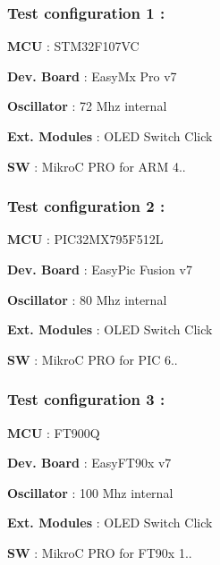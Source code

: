 \subsubsection*{Test configuration 1 \+: }

\begin{DoxyParagraph}{}

\begin{DoxyItemize}
\item {\bfseries M\+C\+U} \+: S\+T\+M32\+F107\+V\+C 
\item {\bfseries Dev. Board} \+: Easy\+Mx Pro v7 
\item {\bfseries Oscillator} \+: 72 Mhz internal 
\item {\bfseries Ext. Modules} \+: O\+L\+E\+D Switch Click 
\item {\bfseries S\+W} \+: Mikro\+C P\+R\+O for A\+R\+M 4.. 
\end{DoxyItemize}
\end{DoxyParagraph}
\subsubsection*{Test configuration 2 \+: }

\begin{DoxyParagraph}{}

\begin{DoxyItemize}
\item {\bfseries M\+C\+U} \+: P\+I\+C32\+M\+X795\+F512\+L 
\item {\bfseries Dev. Board} \+: Easy\+Pic Fusion v7 
\item {\bfseries Oscillator} \+: 80 Mhz internal 
\item {\bfseries Ext. Modules} \+: O\+L\+E\+D Switch Click 
\item {\bfseries S\+W} \+: Mikro\+C P\+R\+O for P\+I\+C 6.. 
\end{DoxyItemize}
\end{DoxyParagraph}
\subsubsection*{Test configuration 3 \+: }

\begin{DoxyParagraph}{}

\begin{DoxyItemize}
\item {\bfseries M\+C\+U} \+: F\+T900\+Q 
\item {\bfseries Dev. Board} \+: Easy\+F\+T90x v7 
\item {\bfseries Oscillator} \+: 100 Mhz internal 
\item {\bfseries Ext. Modules} \+: O\+L\+E\+D Switch Click 
\item {\bfseries S\+W} \+: Mikro\+C P\+R\+O for F\+T90x 1.. 
\end{DoxyItemize}
\end{DoxyParagraph}
